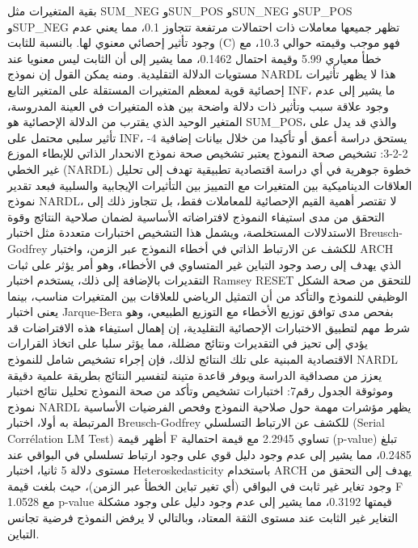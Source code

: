 \documentclass[12pt,a4paper]{report}
\begin{document}
بقية المتغيرات مثل SUM_NEG وSUN_POS وSUN_NEG وSUP_POS وSUP_NEG تظهر جميعها معاملات ذات احتمالات مرتفعة تتجاوز 0.1، مما يعني عدم وجود تأثير إحصائي معنوي لها.
بالنسبة للثابت (C) فهو موجب وقيمته حوالي 10.3، مع خطأ معياري 5.99 وقيمة احتمال 0.1462، مما يشير إلى أن الثابت ليس معنويا عند مستويات الدلالة التقليدية.
ومنه يمكن القول إن نموذج NARDL هذا لا يظهر تأثيرات إحصائية قوية لمعظم المتغيرات المستقلة على المتغير التابع INF، ما يشير إلى عدم وجود علاقة سبب وتأثير ذات دلالة واضحة بين هذه المتغيرات في العينة المدروسة، المتغير الوحيد الذي يقترب من الدلالة الإحصائية هو SUM_POS، والذي قد يدل على تأثير سلبي محتمل على INF، يستحق دراسة أعمق أو تأكيدا من خلال بيانات إضافية
4-2-2-3: تشخيص صحة النموذج
يعتبر تشخيص صحة نموذج الانحدار الذاتي للإبطاء الموزع غير الخطي (NARDL) خطوة جوهرية في أي دراسة اقتصادية تطبيقية تهدف إلى تحليل العلاقات الديناميكية بين المتغيرات مع التمييز بين التأثيرات الإيجابية والسلبية فبعد تقدير نموذج NARDL، لا تقتصر أهمية القيم الإحصائية للمعاملات فقط، بل تتجاوز ذلك إلى التحقق من مدى استيفاء النموذج لافتراضاته الأساسية لضمان صلاحية النتائج وقوة الاستدلالات المستخلصة، ويشمل هذا التشخيص اختبارات متعددة مثل اختبار Breusch-Godfrey للكشف عن الارتباط الذاتي في أخطاء النموذج عبر الزمن، واختبار ARCH الذي يهدف إلى رصد وجود التباين غير المتساوي في الأخطاء، وهو أمر يؤثر على ثبات التقديرات بالإضافة إلى ذلك، يستخدم اختبار Ramsey RESET للتحقق من صحة الشكل الوظيفي للنموذج والتأكد من أن التمثيل الرياضي للعلاقات بين المتغيرات مناسب، بينما يعنى اختبار Jarque-Bera بفحص مدى توافق توزيع الأخطاء مع التوزيع الطبيعي، وهو شرط مهم لتطبيق الاختبارات الإحصائية التقليدية، إن إهمال استيفاء هذه الافتراضات قد يؤدي إلى تحيز في التقديرات ونتائج مضللة، مما يؤثر سلبا على اتخاذ القرارات الاقتصادية المبنية على تلك النتائج لذلك، فإن إجراء تشخيص شامل للنموذج NARDL يعزز من مصداقية الدراسة ويوفر قاعدة متينة لتفسير النتائج بطريقة علمية دقيقة وموثوقة
الجدول رقم7: اختبارات تشخيص وتأكد من صحة النموذج
تحليل نتائج اختبار نموذج NARDL يظهر مؤشرات مهمة حول صلاحية النموذج وفحص الفرضيات الأساسية المرتبطة به أولا، اختبار Breusch-Godfrey للكشف عن الارتباط التسلسلي (Serial Corrélation LM Test) أظهر قيمة F تساوي 2.2945 مع قيمة احتمالية (p-value) تبلغ 0.2485، مما يشير إلى عدم وجود دليل قوي على وجود ارتباط تسلسلي في البواقي عند مستوى دلالة 5%
ثانيا، اختبار Heteroskedasticity باستخدام ARCH يهدف إلى التحقق من وجود تغاير غير ثابت في البواقي (أي تغير تباين الخطأ عبر الزمن)، حيث بلغت قيمة F 1.0528 مع p-value قيمتها 0.3192، مما يشير إلى عدم وجود دليل على وجود مشكلة التغاير غير الثابت عند مستوى الثقة المعتاد، وبالتالي لا يرفض النموذج فرضية تجانس التباين.
\end{document}

